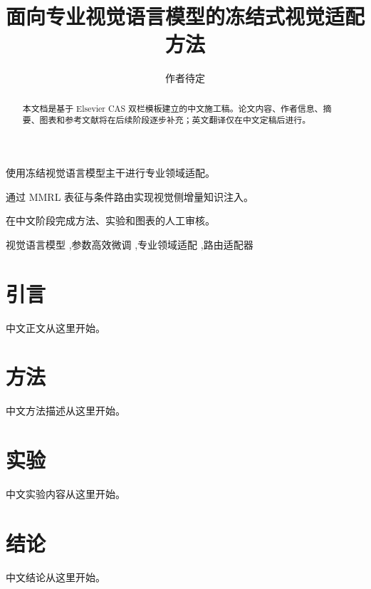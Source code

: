\documentclass[a4paper,fleqn]{cas-dc}
\begin{document}
\let\WriteBookmarks\relax

\title[mode=title]{面向专业视觉语言模型的冻结式视觉适配方法}

\author[1]{作者待定}


\begin{abstract}
本文档是基于 Elsevier CAS 双栏模板建立的中文施工稿。论文内容、作者信息、摘要、图表和参考文献将在后续阶段逐步补充；英文翻译仅在中文定稿后进行。
\end{abstract}

\begin{highlights}
\item 使用冻结视觉语言模型主干进行专业领域适配。
\item 通过 MMRL 表征与条件路由实现视觉侧增量知识注入。
\item 在中文阶段完成方法、实验和图表的人工审核。
\end{highlights}

\begin{keywords}
视觉语言模型 \sep 参数高效微调 \sep 专业领域适配 \sep 路由适配器
\end{keywords}

\maketitle

\section{引言}
\label{sec:introduction}

中文正文从这里开始。

\section{方法}
\label{sec:method}

中文方法描述从这里开始。

\section{实验}
\label{sec:experiments}

中文实验内容从这里开始。

\section{结论}
\label{sec:conclusion}

中文结论从这里开始。

% 
% 
\end{document}
